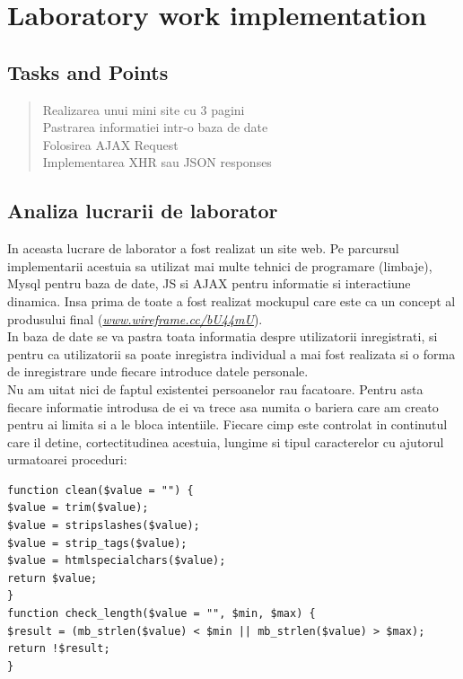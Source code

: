 \section{Laboratory work implementation}

\subsection{Tasks and Points}

\begin{quote}
\begin{description}

	Realizarea unui mini site cu 3 pagini \\
	Pastrarea informatiei intr-o baza de date\\
	Folosirea AJAX Request\\
	Implementarea XHR sau JSON responses\\

\end{description}
\end{quote}

\subsection{Analiza lucrarii de laborator}

In aceasta lucrare de laborator a fost realizat un site web. Pe parcursul implementarii acestuia sa utilizat mai multe tehnici de programare (limbaje), Mysql pentru baza de date, JS si AJAX pentru informatie si interactiune dinamica.
Insa prima de toate a fost realizat mockupul care este ca un concept al produsului final (\emph{\url{www.wireframe.cc/bU44mU}}). \\
In baza de date se va pastra toata informatia despre utilizatorii inregistrati, si pentru ca utilizatorii sa poate inregistra individual a mai fost realizata si o forma de inregistrare unde fiecare introduce datele personale. \\
Nu am uitat nici de faptul existentei persoanelor rau facatoare. Pentru asta fiecare informatie introdusa de ei va trece asa numita o bariera care am creato pentru ai limita si a le bloca intentiile. Fiecare cimp este controlat in continutul care il detine, cortectitudinea acestuia, lungime si tipul caracterelor cu ajutorul urmatoarei proceduri:
\begin{verbatim}
function clean($value = "") {
$value = trim($value);
$value = stripslashes($value);
$value = strip_tags($value);
$value = htmlspecialchars($value);
return $value;
}
function check_length($value = "", $min, $max) {
$result = (mb_strlen($value) < $min || mb_strlen($value) > $max);
return !$result;
}
\end{verbatim}

